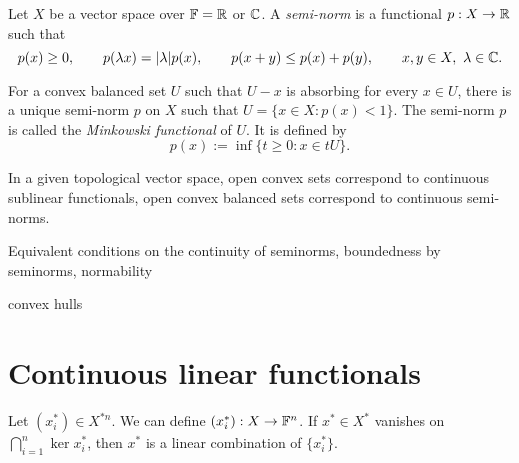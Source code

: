 \documentclass{../../large}
\begin{document}
\begin{prb}[Seminorms]
Let $X$ be a vector space over $\mathbb{F}=\mathbb{R}$ or $\mathbb{C}$.
A \emph{semi-norm} is a functional $p:X\to\mathbb{R}$ such that
\[p(x)\ge0,\qquad p(\lambda x)=|\lambda|p(x),\qquad p(x+y)\le p(x)+p(y),\qquad x,y\in X,\ \lambda\in\mathbb{C}.\]


For a convex balanced set $U$ such that $U-x$ is absorbing for every $x\in U$, there is a unique semi-norm $p$ on $X$ such that $U=\{x\in X:p(x)<1\}$.
The semi-norm $p$ is called the \emph{Minkowski functional} of $U$.
It is defined by
\[p(x):=\inf\{t\ge0:x\in tU\}.\]

In a given topological vector space, open convex sets correspond to continuous sublinear functionals, open convex balanced sets correspond to continuous semi-norms.

Equivalent conditions on the continuity of seminorms,
boundedness by seminorms,
normability
\end{prb}
\begin{pf}
\end{pf}

\begin{prb}
convex hulls
\end{prb}



\section{Continuous linear functionals}
\begin{prb}
Let $(x_i^*)\in X^{*n}$.
We can define $(x_i^*):X\to\mathbb{F}^n$.
If $x^*\in X^*$ vanishes on $\bigcap_{i=1}^n\ker x_i^*$, then $x^*$ is a linear combination of $\{x_i^*\}$.
\end{prb}
\end{document}
